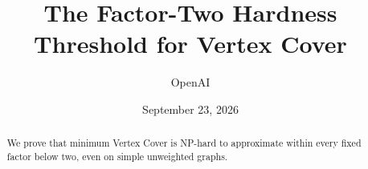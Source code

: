 \documentclass[11pt]{article}
\title{The Factor-Two Hardness Threshold for Vertex Cover}
\author{OpenAI}
\date{September 23, 2026}
\numberwithin{equation}{section}
\theoremstyle{definition}
\theoremstyle{remark}
\begin{document}
\maketitle
\begin{abstract}
We prove that minimum Vertex Cover is NP-hard to approximate within
every fixed factor below two, even on simple unweighted graphs.
\end{abstract}













\end{document}
